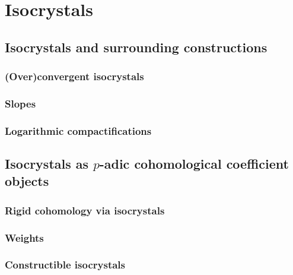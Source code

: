 \section{Isocrystals}
    \subsection{Isocrystals and surrounding constructions}
        \subsubsection{(Over)convergent isocrystals}
        
        \subsubsection{Slopes}
        
        \subsubsection{Logarithmic compactifications}
        
    \subsection{Isocrystals as \texorpdfstring{$p$}{}-adic cohomological coefficient objects}
        \subsubsection{Rigid cohomology via isocrystals}
        
        \subsubsection{Weights}
        
        \subsubsection{Constructible isocrystals}